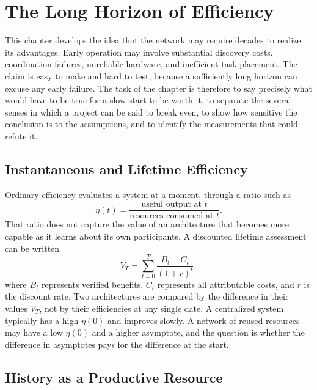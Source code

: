 \chapter{The Long Horizon of Efficiency}
\label{ch:horizon}

This chapter develops the idea that the network may require decades to realize its advantages. Early operation may involve substantial discovery costs, coordination failures, unreliable hardware, and inefficient task placement. The claim is easy to make and hard to test, because a sufficiently long horizon can excuse any early failure. The task of the chapter is therefore to say precisely what would have to be true for a slow start to be worth it, to separate the several senses in which a project can be said to break even, to show how sensitive the conclusion is to the assumptions, and to identify the measurements that could refute it.

\section{Instantaneous and Lifetime Efficiency}

Ordinary efficiency evaluates a system at a moment, through a ratio such as
\[
\eta(t)=\frac{\text{useful output at }t}{\text{resources consumed at }t}.
\]
That ratio does not capture the value of an architecture that becomes more capable as it learns about its own participants. A discounted lifetime assessment can be written
\[
V_T=\sum_{t=0}^{T}\frac{B_t-C_t}{(1+r)^t},
\]
where $B_t$ represents verified benefits, $C_t$ represents all attributable costs, and $r$ is the discount rate. Two architectures are compared by the difference in their values $V_T$, not by their efficiencies at any single date. A centralized system typically has a high $\eta(0)$ and improves slowly. A network of reused resources may have a low $\eta(0)$ and a higher asymptote, and the question is whether the difference in asymptotes pays for the difference at the start.

\section{History as a Productive Resource}

